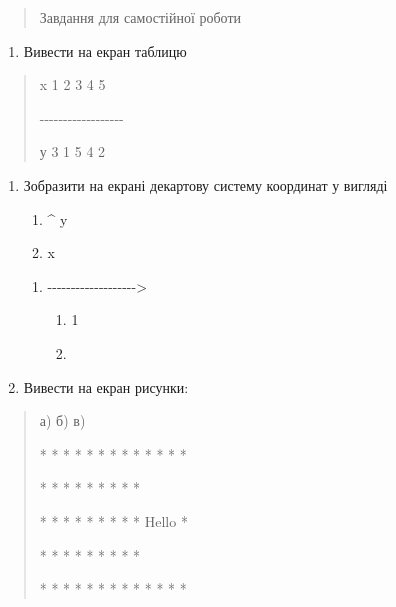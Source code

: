 \documentclass[]{article}
\begin{document}
\begin{quote}
Завдання для самостійної роботи
\end{quote}

\begin{enumerate}
\def\labelenumi{\arabic{enumi}.}
\item
  Вивести на екран таблицю
\end{enumerate}

\begin{quote}
x \textbar{} 1 \textbar{} 2 \textbar{} 3 \textbar{} 4 \textbar{} 5

-\/-\/-\/-\/-\/-\/-\/-\/-\/-\/-\/-\/-\/-\/-\/-\/-\/-

у \textbar{} 3 \textbar{} 1 \textbar{} 5 \textbar{} 4 \textbar{} 2
\end{quote}

\begin{enumerate}
\def\labelenumi{\arabic{enumi}.}
\item
  Зобразити на екрані декартову систему координат у вигляді

  \begin{enumerate}
  \def\labelenumii{\roman{enumii}.}
  \item
    \^{} y
  \item
    \textbar{} x
  \end{enumerate}

  \begin{enumerate}
  \def\labelenumii{\alph{enumii}.}
  \item
    -\/-\/-\/-\/-\/-\/-\/-\/-\/-\/-\/-\/-\/-\/-\/-\/-\/-\/-\textgreater{}

    \begin{enumerate}
    \def\labelenumiii{\roman{enumiii}.}
    \item
      \textbar{} 1
    \item
      \textbar{}
    \end{enumerate}
  \end{enumerate}
\item
  Вивести на екран рисунки:
\end{enumerate}

\begin{quote}
а) б) в)

* * * * * * * * * * * * *

* * * * * * * * *

* * * * * * * * * Hello *

* * * * * * * * *

* * * * * * * * * * * * *
\end{quote}
\end{document}
